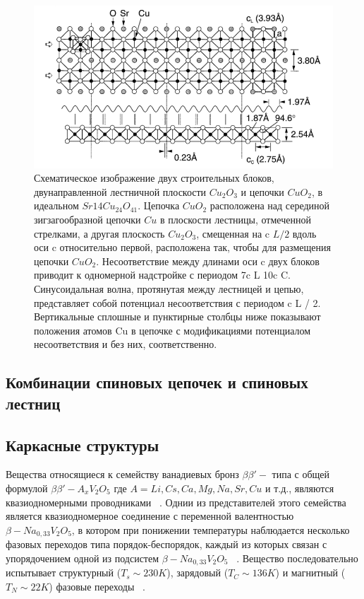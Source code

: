 \documentclass[11pt]{article}
\begin{document}
\begin{figure}[htp]
\centering
\includegraphics[scale=0.5]{Sr_14_Cu_24_O_41_b}
\caption{Схематическое изображение двух строительных блоков, двунаправленной лестничной плоскости $Cu_2O_3$ и цепочки $CuO_ 2$, в идеальном $Sr{14}Cu_{24}O_{41}$.  Цепочка $CuO_2$ расположена над серединой зигзагообразной цепочки $Cu$ в плоскости лестницы, отмеченной стрелками, а другая плоскость $Cu_2O_3$, смещенная на c $L/2$ вдоль оси c относительно первой, расположена так, чтобы для размещения цепочки $CuO_2$. Несоответствие между длинами оси c двух блоков приводит к одномерной надстройке с периодом 7c L 10c C. Синусоидальная волна, протянутая между лестницей и цепью, представляет собой потенциал несоответствия с периодом c L / 2. Вертикальные сплошные и пунктирные столбцы ниже показывают положения атомов Cu в цепочке с модификациями потенциалом несоответствия и без них, соответственно.~\cite{hiroi1996}}
\label{}
\end{figure}

\subsection{Комбинации спиновых цепочек и спиновых лестниц}

\subsection{Каркасные структуры}
Вещества относящиеся к семейству ванадиевых бронз $\beta{\beta'}-$ типа с общей формулой $\beta{\beta'}-A_xV_2O_5$ где $A=Li, Cs, Ca, Mg, Na, Sr, Cu$ и т.д., являются квазиодномерными проводниками ~\cite{Ueda_1998}. Однии из представителей этого семейства является квазиодномерное соединение с переменной валентностью $\beta-Na_{0,33}V_2O_5$, в котором при понижении температуры наблюдается несколько фазовых переходов типа порядок-беспорядок, каждый из которых связан с упорядочением одной из подсистем $\beta-Na_{0,33}V_2O_5$ ~\cite{nm}. Вещество последовательно испытывает структурный ($T_s \sim 230K$), зарядовый ($T_C \sim 136K$) и магнитный ($T_N \sim 22K $) фазовые переходы ~\cite{yamada1999, yamauchi2002, onoda1982, presura2003}. 
\end{document}
